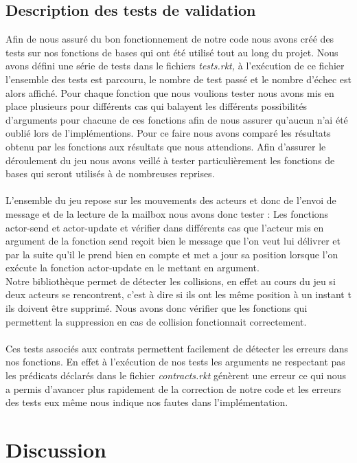 \documentclass[a4paper,10pt]{article}
\begin{document}
\subsection{Description des tests de validation}
\label{tests}
Afin de nous assuré du bon fonctionnement de notre code nous avons créé des tests sur nos fonctions de bases qui ont été utilisé tout au long du projet. Nous avons défini une série de tests dans le fichiers \textit{tests.rkt,} à l'exécution de ce fichier l'ensemble des tests est parcouru, le nombre de test passé et le nombre d'échec est alors affiché. Pour chaque fonction que nous voulions tester nous avons mis en place plusieurs pour différents cas qui balayent les différents possibilités d'arguments pour chacune de ces fonctions afin de nous assurer qu'aucun n'ai été oublié lors de l'implémentions. Pour ce faire nous avons comparé les résultats obtenu par les fonctions aux résultats que nous attendions.
Afin d'assurer le déroulement du jeu nous avons veillé à tester particulièrement les fonctions de bases qui seront utilisés à de nombreuses reprises.\\
\\
L'ensemble du jeu repose sur les mouvements des acteurs et donc de l'envoi de message et de la lecture de la mailbox nous avons donc tester :
Les fonctions actor-send et actor-update et vérifier dans différents cas que l'acteur mis en argument de la fonction send reçoit bien le message que l'on veut lui délivrer et par la suite qu'il le prend bien en compte et met a jour sa position lorsque l'on exécute la fonction actor-update en le mettant en argument.\\
Notre bibliothèque permet de détecter les collisions, en effet au cours du jeu si deux acteurs se rencontrent, c'est à dire si ils ont les même position à un instant t ils doivent être supprimé. Nous avons donc vérifier que les fonctions qui permettent la suppression en cas de collision fonctionnait correctement.\\
\\
Ces tests associés aux contrats permettent facilement de détecter les erreurs dans nos fonctions. En effet à l'exécution de nos tests les arguments ne respectant pas les prédicats déclarés dans le fichier \textit{contracts.rkt} génèrent une erreur ce qui nous a permis d'avancer plus rapidement de la correction de notre code et les erreurs des tests eux même nous indique nos fautes dans l'implémentation.

\section{Discussion}
\end{document}
